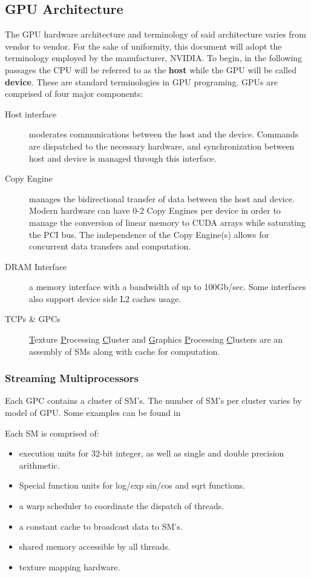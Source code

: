 \subsection{GPU Architecture}\label{ssec:gpu_architecture}
The GPU hardware architecture and terminology of said architecture varies from
vendor to vendor.  For the sake of uniformity, this document will adopt the
terminology employed by the manufacturer, NVIDIA.  To begin, in the following passages the CPU
will be referred to as the \textbf{host} while the GPU will be called \textbf{device}.
These are standard terminologies in GPU programing. GPUs are comprised of four major components:
\begin{description}
  \item[Host interface] moderates communications between the host and the device.
  Commands are dispatched to the necessary hardware, and synchronization between
  host and device is managed through this interface.
  \item[Copy Engine] manages the bidirectional transfer of data between the host
  and device.  Modern hardware can have 0-2 Copy Engines per device in order to
  manage the conversion of linear memory to CUDA arrays while saturating the PCI
  bus.  The independence of the Copy Engine(s) allows for concurrent data transfers
  and computation.
  \item[DRAM Interface] a memory interface with a bandwidth of up to 100Gb/sec.
  Some interfaces also support device side L2 caches usage.
  \item[TCPs \& GPCs] \underline{T}exture \underline{P}rocessing \underline{C}luster
  and \underline{G}raphics \underline{P}rocessing \underline{C}lusters are an assembly
  of \Glspl{SM} along with cache for computation.
\end{description}\cite{Wilt}

\subsubsection{Streaming Multiprocessors}
Each GPC contains a cluster of SM's.  The number of SM's per cluster varies by
model of GPU. Some examples can be found in %


Each SM is comprised of: \cite{Wilt}
\begin{itemize}
  \item execution units for 32-bit integer, as well as single and double precision arithmetic.
  \item Special function units for log/exp sin/cos and sqrt functions.
  \item a warp scheduler to coordinate the dispatch of threads.
  \item a constant cache to broadcast data to SM's.
  \item shared memory accessible by all threads.
  \item texture mapping hardware.
\end{itemize}

